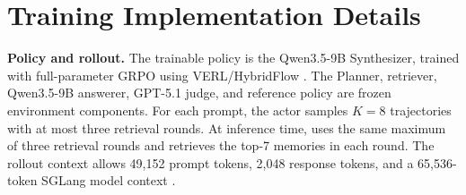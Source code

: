 \begin{table}[H]
  \centering
  \caption{Model combinations used in the main evaluation tables. The
  final-answer model is the model whose output is judged for answer accuracy.
  GPT-5.1 is the fixed judge for all methods, not the answerer for all methods.}
  \label{tab:model-combo}
  \scriptsize
\end{table}

\section{Training Implementation Details}
\label{app:training-hyperparameters}

\textbf{Policy and rollout.}
The trainable policy is the Qwen3.5-9B Synthesizer, trained with
full-parameter GRPO using VERL/HybridFlow \cite{sheng2024hybridflow}. The
Planner, \sys{} retriever, Qwen3.5-9B answerer, GPT-5.1 judge, and reference
policy are frozen environment components. For each prompt, the actor samples
\(K=8\) trajectories with at most three retrieval rounds. At inference time,
\sys{} uses the same maximum of three retrieval rounds and retrieves the top-7
memories in each round. The rollout context allows 49,152 prompt tokens, 2,048
response tokens, and a 65,536-token SGLang model context
\cite{zheng2023sglang}.

